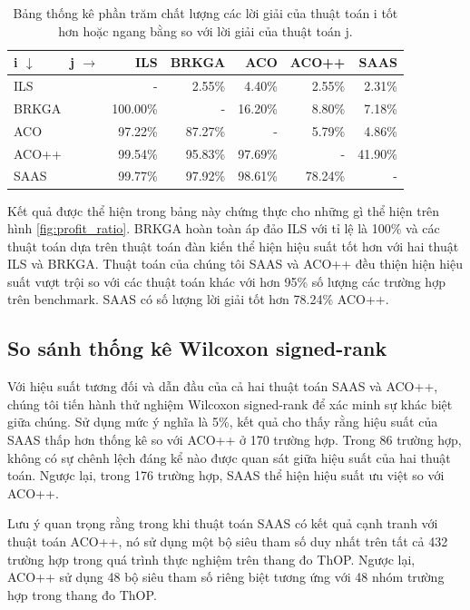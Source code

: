 \begin{table}[ht!]
  \begin{center}      
        \begin{tabular}{lrrrrr}
        \toprule
        i $\downarrow$ \ \ \ \ j $\rightarrow$  & ILS & BRKGA & ACO & ACO++ & SAAS \\
        \midrule
        ILS & - & 2.55\% & 4.40\% & 2.55\% & 2.31\% \\
        BRKGA & 100.00\% & - & 16.20\% & 8.80\% & 7.18\% \\
        ACO & 97.22\% & 87.27\% & - & 5.79\% & 4.86\% \\
        ACO++ & 99.54\% & 95.83\% & 97.69\% & - & 41.90\% \\
        SAAS & 99.77\% & 97.92\% & 98.61\% & 78.24\% & - \\
        \bottomrule
        \end{tabular}
      \caption[Kết quả thực nghiệm so sánh hiệu suất giữa các thuật toán.]{
      \label{tab:winpercent}Bảng thống kê phần trăm chất lượng các lời giải của thuật toán i tốt hơn hoặc ngang bằng so với lời giải của thuật toán j.}
  \end{center}
\end{table}

Kết quả được thể hiện trong bảng này chứng thực cho những gì thể hiện trên hình \ref{fig:profit_ratio}. BRKGA hoàn toàn áp đảo ILS với tỉ lệ là 100\% và các thuật toán dựa trên thuật toán đàn kiến thể hiện hiệu suất tốt hơn với hai thuật ILS và BRKGA. Thuật toán của chúng tôi SAAS và ACO++ đều thiện hiện hiệu suất vượt trội so với các thuật toán khác với hơn 95\% số lượng các trường hợp trên benchmark. SAAS có số lượng lời giải tốt hơn 78.24\% ACO++. 
\subsection {So sánh thống kê Wilcoxon signed-rank}
Với hiệu suất tương đối và dẫn đầu của cả hai thuật toán SAAS và ACO++, chúng tôi tiến hành thử nghiệm Wilcoxon signed-rank để xác minh sự khác biệt giữa chúng. Sử dụng mức ý nghĩa là 5\%, kết quả cho thấy rằng hiệu suất của SAAS thấp hơn thống kê so với ACO++ ở 170 trường hợp. Trong 86 trường hợp, không có sự chênh lệch đáng kể nào được quan sát giữa hiệu suất của hai thuật toán. Ngược lại, trong 176 trường hợp, SAAS thể hiện hiệu suất ưu việt so với ACO++.

Lưu ý quan trọng rằng trong khi thuật toán SAAS có kết quả cạnh tranh với thuật toán ACO++, nó sử dụng một bộ siêu tham số duy nhất trên tất cả 432 trường hợp trong quá trình thực nghiệm trên thang đo ThOP. Ngược lại, ACO++ sử dụng 48 bộ siêu tham số riêng biệt tương ứng với 48 nhóm trường hợp trong thang đo ThOP.

